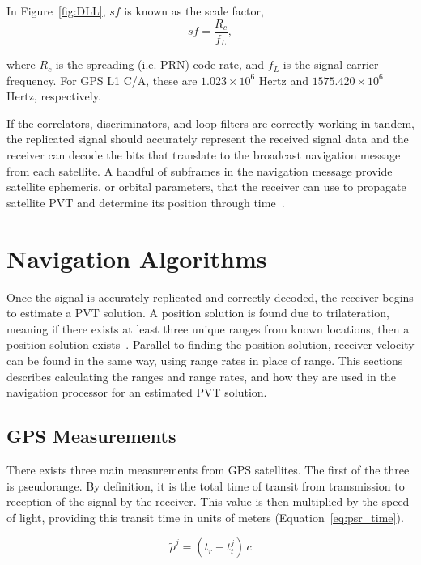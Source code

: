 In Figure~\ref{fig:DLL}, \(sf\) is known as the scale factor,
\begin{equation}\label{eq:sf}
    sf = \frac{R_c}{f_L},
\end{equation}

where \(R_c\) is the spreading (i.e. PRN) code rate, and \(f_L\) is the signal carrier frequency. For GPS L1 C/A, these are \(1.023 \times 10^6\) Hertz and \(1575.420 \times 10^6\) Hertz, respectively.

If the correlators, discriminators, and loop filters are correctly working in tandem, the replicated signal should accurately represent the received signal data and the receiver can decode the bits that translate to the broadcast navigation message from each satellite. A handful of subframes in the navigation message provide satellite ephemeris, or orbital parameters, that the receiver can use to propagate satellite PVT and determine its position through time~\cite{valladoSGP4OrbitDetermination2008}.

\section{\textbf{Navigation Algorithms}}
Once the signal is accurately replicated and correctly decoded, the receiver begins to estimate a PVT solution. A position solution is found due to trilateration, meaning if there exists at least three unique ranges from known locations, then a position solution exists~\cite{subiranaGNSSDATAPROCESSING}. Parallel to finding the position solution, receiver velocity can be found in the same way, using range rates in place of range. This sections describes calculating the ranges and range rates, and how they are used in the navigation processor for an estimated PVT solution.

\subsection{\textbf{GPS Measurements}}
There exists three main measurements from GPS satellites. The first of the three is pseudorange. By definition, it is the total time of transit from transmission to reception of the signal by the receiver. This value is then multiplied by the speed of light, providing this transit time in units of meters (Equation~\ref{eq:psr_time}).

\begin{equation}\label{eq:psr_time}
    \tilde{\rho}^j = (t_r - t_t^j)\,c
\end{equation}

